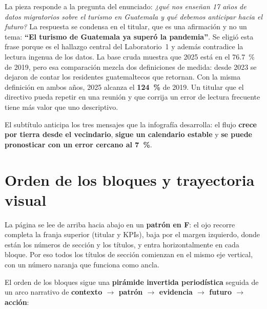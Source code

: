 \documentclass[12pt,letterpaper]{article}
\begin{document}
La pieza responde a la pregunta del enunciado: \textit{¿qué nos enseñan 17 años de datos
migratorios sobre el turismo en Guatemala y qué debemos anticipar hacia el futuro?} La respuesta
se condensa en el titular, que es una afirmación y no un tema: \textbf{``El turismo de Guatemala
ya superó la pandemia''}. Se eligió esta frase porque es el hallazgo central del Laboratorio~1 y
además contradice la lectura ingenua de los datos. La base cruda muestra que 2025 está en el
76.7~\% de 2019, pero esa comparación mezcla dos definiciones de medida: desde 2023 se dejaron de
contar los residentes guatemaltecos que retornan. Con la misma definición en ambos años, 2025
alcanza el \textbf{124~\%} de 2019. Un titular que el directivo pueda repetir en una reunión y
que corrija un error de lectura frecuente tiene más valor que uno descriptivo.

El subtítulo anticipa los tres mensajes que la infografía desarrolla: el flujo \textbf{crece por
tierra desde el vecindario}, \textbf{sigue un calendario estable} y \textbf{se puede pronosticar
con un error cercano al 7~\%}.

\section{Orden de los bloques y trayectoria visual}

La página se lee de arriba hacia abajo en un \textbf{patrón en F}: el ojo recorre completa la
franja superior (titular y KPIs), baja por el margen izquierdo, donde están los números de
sección y los títulos, y entra horizontalmente en cada bloque. Por eso todos los títulos de
sección comienzan en el mismo eje vertical, con un número naranja que funciona como ancla.

El orden de los bloques sigue una \textbf{pirámide invertida periodística} seguida de un arco
narrativo de \textbf{contexto $\rightarrow$ patrón $\rightarrow$ evidencia $\rightarrow$ futuro
$\rightarrow$ acción}:
\end{document}
